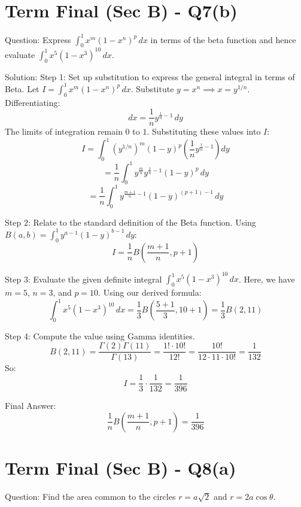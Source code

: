 \documentclass{article}
\begin{document}
\section*{Term Final (Sec B) - Q7(b)}
Question:
Express \(\int_0^1 x^m (1 - x^n)^p \, dx\) in terms of the beta function and hence evaluate \(\int_0^1 x^5 (1 - x^3)^{10} \, dx\).

Solution:
Step 1: Set up substitution to express the general integral in terms of Beta.
Let \(I = \int_0^1 x^m (1 - x^n)^p \, dx\).
Substitute \(y = x^n \implies x = y^{1/n}\).
Differentiating:
\[
dx = \frac{1}{n} y^{\frac{1}{n} - 1} \, dy
\]
The limits of integration remain \(0\) to \(1\). Substituting these values into \(I\):
\[
I = \int_0^1 \left(y^{1/n}\right)^m (1-y)^p \left(\frac{1}{n} y^{\frac{1}{n}-1}\right) dy
\]
\[
= \frac{1}{n} \int_0^1 y^{\frac{m}{n}} y^{\frac{1}{n}-1} (1-y)^p \, dy
\]
\[
= \frac{1}{n} \int_0^1 y^{\frac{m+1}{n}-1} (1-y)^{(p+1)-1} \, dy
\]

Step 2: Relate to the standard definition of the Beta function.
Using \(B(a, b) = \int_0^1 y^{a-1}(1-y)^{b-1} \, dy\):
\[
I = \frac{1}{n} B\left(\frac{m+1}{n}, p+1\right)
\]

Step 3: Evaluate the given definite integral \(\int_0^1 x^5 (1 - x^3)^{10} \, dx\).
Here, we have \(m = 5\), \(n = 3\), and \(p = 10\).
Using our derived formula:
\[
\int_0^1 x^5 (1 - x^3)^{10} \, dx = \frac{1}{3} B\left(\frac{5+1}{3}, 10+1\right) = \frac{1}{3} B(2, 11)
\]

Step 4: Compute the value using Gamma identities.
\[
B(2, 11) = \frac{\Gamma(2)\Gamma(11)}{\Gamma(13)} = \frac{1! \cdot 10!}{12!} = \frac{10!}{12 \cdot 11 \cdot 10!} = \frac{1}{132}
\]
So:
\[
I = \frac{1}{3} \cdot \frac{1}{132} = \frac{1}{396}
\]

Final Answer:
\[
\boxed{\frac{1}{n} B\left(\frac{m+1}{n}, p+1\right) = \frac{1}{396}}
\]

\section*{Term Final (Sec B) - Q8(a)}
Question:
Find the area common to the circles \(r = a\sqrt{2}\) and \(r = 2a \cos \theta\).
\end{document}
